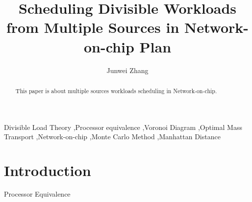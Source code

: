 \documentclass[preprint,12pt]{elsarticle}
\begin{document}
\begin{frontmatter}


\title{Scheduling Divisible Workloads from Multiple Sources in Network-on-chip Plan}




\author{Junwei Zhang}

\address{Stony Brook, New York}

\begin{abstract}
This paper is about multiple sources workloads scheduling in Network-on-chip.
\end{abstract}

\begin{keyword}
Divisible Load Theory \sep Processor equivalence \sep Voronoi Diagram \sep Optimal Mass Transport \sep Network-on-chip \sep Monte Carlo Method
\sep Manhattan Distance 


\end{keyword}

\end{frontmatter}


\section{Introduction}
\label{S:1}
Processor Equivalence\cite{robertazzi1993processor} \cite{jia2010scheduling}
\end{document}
